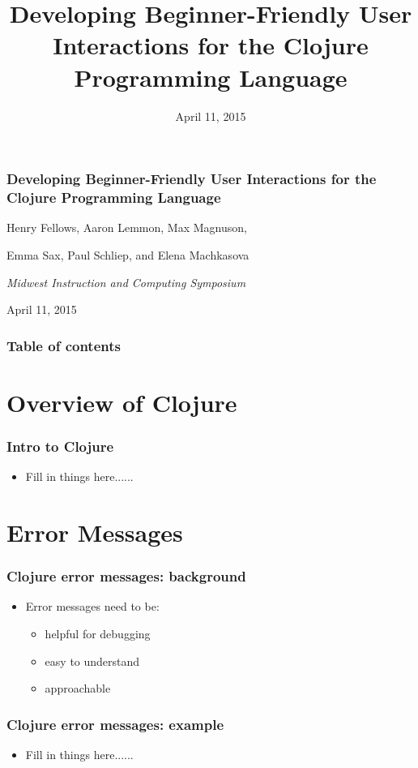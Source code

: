 \documentclass{beamer}
\begin{document}
\title{Developing Beginner-Friendly User Interactions for the Clojure Programming Language}
\date{April 11, 2015}

\begin{frame}
\frametitle{Developing Beginner-Friendly User Interactions for the Clojure Programming Language}
{\centering
\noindent
Henry Fellows, Aaron Lemmon, Max Magnuson, \par
Emma Sax, Paul Schliep, and Elena Machkasova \par

{\it 
Midwest Instruction and Computing Symposium\par
April 11, 2015\par}
}
\end{frame}

\begin{frame}
\frametitle{Table of contents}
\tableofcontents  
\end{frame}

\section{Overview of Clojure}

\begin{frame}
\frametitle{Intro to Clojure}
	\begin{itemize}
  	 \item Fill in things here......
	 \end{itemize}
\end{frame}

\section{Error Messages}

\begin{frame}
\frametitle{Clojure error messages: background}
	\begin{itemize}
  		\item Error messages need to be:
  		\begin{itemize}
  	 		\item helpful for debugging
  	 		\item easy to understand
  	 		\item approachable
  		\end{itemize}
	 \end{itemize}
\end{frame}

\begin{frame}[fragile]
\frametitle{Clojure error messages: example}
	\begin{itemize}
  	 \item Fill in things here......
	 \end{itemize}
\end{frame}
\end{document}
